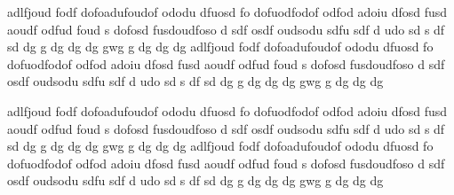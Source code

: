 \chapterAppendix[title=Second chapter appendix]

adlfjoud fodf dofoadufoudof ododu dfuosd fo dofuodfodof odfod adoiu dfosd 
fusd aoudf odfud foud s dofosd fusdoudfoso d sdf osdf oudsodu sdfu sdf d 
udo sd s df sd dg g dg dg dg gwg g dg dg dg adlfjoud fodf dofoadufoudof 
ododu dfuosd fo dofuodfodof odfod adoiu dfosd fusd aoudf odfud foud s 
dofosd fusdoudfoso d sdf osdf oudsodu sdfu sdf d udo sd s df sd dg g dg dg 
dg gwg g dg dg dg 

\chapterAppendix[title=Third chapter appendix]

adlfjoud fodf dofoadufoudof ododu dfuosd fo dofuodfodof odfod adoiu dfosd 
fusd aoudf odfud foud s dofosd fusdoudfoso d sdf osdf oudsodu sdfu sdf d 
udo sd s df sd dg g dg dg dg gwg g dg dg dg adlfjoud fodf dofoadufoudof 
ododu dfuosd fo dofuodfodof odfod adoiu dfosd fusd aoudf odfud foud s 
dofosd fusdoudfoso d sdf osdf oudsodu sdfu sdf d udo sd s df sd dg g dg dg 
dg gwg g dg dg dg 

\stopChapterAppendices
